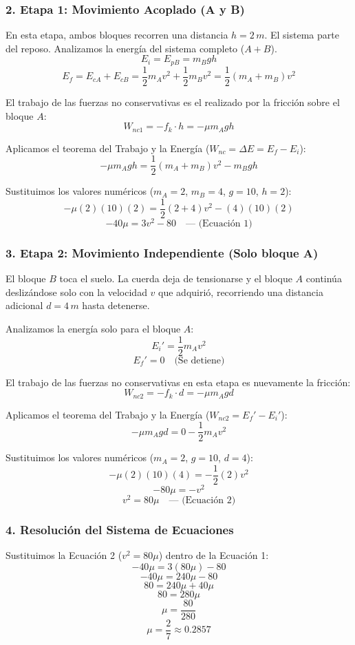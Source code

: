 \documentclass[12pt, a4paper]{article}
\begin{document}
\subsubsection*{2. Etapa 1: Movimiento Acoplado (A y B)}
En esta etapa, ambos bloques recorren una distancia $h = 2 \, \si{m}$.
El sistema parte del reposo. Analizamos la energía del sistema completo ($A + B$).
$$ E_i = E_{pB} = m_B g h $$
$$ E_f = E_{cA} + E_{cB} = \frac{1}{2} m_A v^2 + \frac{1}{2} m_B v^2 = \frac{1}{2} (m_A + m_B) v^2 $$

El trabajo de las fuerzas no conservativas es el realizado por la fricción sobre el bloque $A$:
$$ W_{nc1} = -f_k \cdot h = -\mu m_A g h $$

Aplicamos el teorema del Trabajo y la Energía ($W_{nc} = \Delta E = E_f - E_i$):
$$ -\mu m_A g h = \frac{1}{2} (m_A + m_B) v^2 - m_B g h $$

Sustituimos los valores numéricos ($m_A = 2$, $m_B = 4$, $g = 10$, $h = 2$):
$$ -\mu (2)(10)(2) = \frac{1}{2} (2 + 4) v^2 - (4)(10)(2) $$
$$ -40\mu = 3 v^2 - 80 \quad \text{--- (Ecuación 1)} $$

\subsubsection*{3. Etapa 2: Movimiento Independiente (Solo bloque A)}
El bloque $B$ toca el suelo. La cuerda deja de tensionarse y el bloque $A$ continúa deslizándose solo con la velocidad $v$ que adquirió, recorriendo una distancia adicional $d = 4 \, \si{m}$ hasta detenerse.

Analizamos la energía solo para el bloque $A$:
$$ E_{i}' = \frac{1}{2} m_A v^2 $$
$$ E_{f}' = 0 \quad \text{(Se detiene)} $$

El trabajo de las fuerzas no conservativas en esta etapa es nuevamente la fricción:
$$ W_{nc2} = -f_k \cdot d = -\mu m_A g d $$

Aplicamos el teorema del Trabajo y la Energía ($W_{nc2} = E_{f}' - E_{i}'$):
$$ -\mu m_A g d = 0 - \frac{1}{2} m_A v^2 $$

Sustituimos los valores numéricos ($m_A = 2$, $g = 10$, $d = 4$):
$$ -\mu (2)(10)(4) = -\frac{1}{2} (2) v^2 $$
$$ -80\mu = -v^2 $$
$$ v^2 = 80\mu \quad \text{--- (Ecuación 2)} $$

\subsubsection*{4. Resolución del Sistema de Ecuaciones}
Sustituimos la Ecuación 2 ($v^2 = 80\mu$) dentro de la Ecuación 1:
$$ -40\mu = 3 (80\mu) - 80 $$
$$ -40\mu = 240\mu - 80 $$
$$ 80 = 240\mu + 40\mu $$
$$ 80 = 280\mu $$
$$ \mu = \frac{80}{280} $$
$$ \mu = \frac{2}{7} \approx 0.2857 $$
\end{document}
